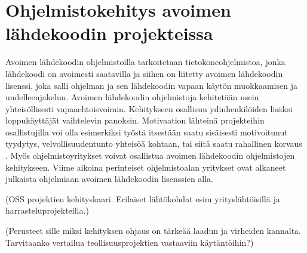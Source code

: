 \documentclass[utf8]{gradu3}
\begin{document}

\chapter{Ohjelmistokehitys avoimen lähdekoodin projekteissa}
Avoimen lähdekoodin ohjelmistoilla tarkoitetaan tietokoneohjelmistoa, jonka
lähdekoodi on avoimesti saatavilla ja siihen on liitetty avoimen lähdekoodin
lisenssi, joka salli ohjelman ja sen lähdekoodin vapaan käytön muokkaamisen ja
uudelleenjakelun. Avoimen lähdekoodin ohjelmistoja kehitetään usein
yhteisöllisesti vapaaehtoisvoimin. Kehitykseen osallisuu ydinhenkilöiden lisäksi
loppukäyttäjät vaihtelevin panoksin. Motivaation lähteinä projekteihin
osallistujilla voi olla esimerkiksi työstä itsestään saatu sisäisesti
motivoitunut tyydytys, velvollisuudentunto yhteisöä kohtaan, tai siitä saatu
rahallinen korvaus \parencite{Lakhani-2005}. %
Myös ohjelmistoyritykset voivat osallistua avoimen lähdekoodin ohjelmistojen
kehitykseen. Viime aikoina perinteiset ohjelmistoalan yritykset ovat alkaneet
julkaista ohjelmiaan avoimen lähdekoodin lisenssien alla.

(OSS projektien kehityskaari. Erilaiset lähtökohdat esim yrityslähtöisillä ja
harrasteluprojekteilla.)

(Perusteet sille miksi kehityksen ohjaus on tärkeää laadun ja virheiden
kannalta. Tarvitaanko vertailua teollisuusprojektien vastaaviin käytäntöihin?)
\end{document}

